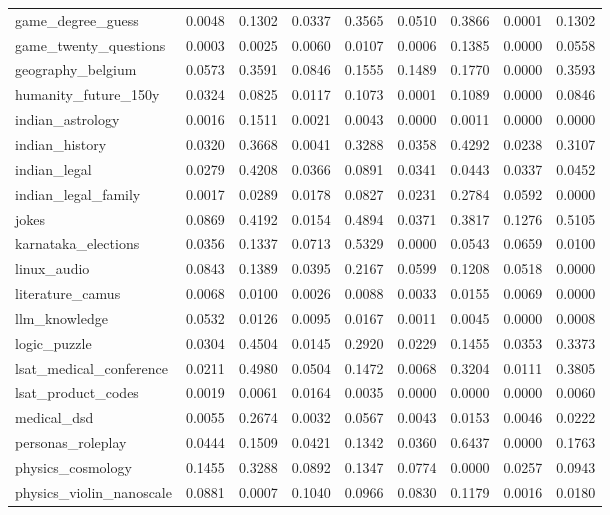 \begin{landscape}
\begin{longtable}{@{}p{3.8cm}cccccccc@{}}
game\_degree\_guess & 0.0048 & 0.1302 & 0.0337 & 0.3565 & 0.0510 & 0.3866 & 0.0001 & 0.1302 \\
game\_twenty\_questions & 0.0003 & 0.0025 & 0.0060 & 0.0107 & 0.0006 & 0.1385 & 0.0000 & 0.0558 \\
geography\_belgium & 0.0573 & 0.3591 & 0.0846 & 0.1555 & 0.1489 & 0.1770 & 0.0000 & 0.3593 \\
humanity\_future\_150y & 0.0324 & 0.0825 & 0.0117 & 0.1073 & 0.0001 & 0.1089 & 0.0000 & 0.0846 \\
indian\_astrology & 0.0016 & 0.1511 & 0.0021 & 0.0043 & 0.0000 & 0.0011 & 0.0000 & 0.0000 \\
indian\_history & 0.0320 & 0.3668 & 0.0041 & 0.3288 & 0.0358 & 0.4292 & 0.0238 & 0.3107 \\
indian\_legal & 0.0279 & 0.4208 & 0.0366 & 0.0891 & 0.0341 & 0.0443 & 0.0337 & 0.0452 \\
indian\_legal\_family & 0.0017 & 0.0289 & 0.0178 & 0.0827 & 0.0231 & 0.2784 & 0.0592 & 0.0000 \\
jokes & 0.0869 & 0.4192 & 0.0154 & 0.4894 & 0.0371 & 0.3817 & 0.1276 & 0.5105 \\
karnataka\_elections & 0.0356 & 0.1337 & 0.0713 & 0.5329 & 0.0000 & 0.0543 & 0.0659 & 0.0100 \\
linux\_audio & 0.0843 & 0.1389 & 0.0395 & 0.2167 & 0.0599 & 0.1208 & 0.0518 & 0.0000 \\
literature\_camus & 0.0068 & 0.0100 & 0.0026 & 0.0088 & 0.0033 & 0.0155 & 0.0069 & 0.0000 \\
llm\_knowledge & 0.0532 & 0.0126 & 0.0095 & 0.0167 & 0.0011 & 0.0045 & 0.0000 & 0.0008 \\
logic\_puzzle & 0.0304 & 0.4504 & 0.0145 & 0.2920 & 0.0229 & 0.1455 & 0.0353 & 0.3373 \\
lsat\_medical\_conference & 0.0211 & 0.4980 & 0.0504 & 0.1472 & 0.0068 & 0.3204 & 0.0111 & 0.3805 \\
lsat\_product\_codes & 0.0019 & 0.0061 & 0.0164 & 0.0035 & 0.0000 & 0.0000 & 0.0000 & 0.0060 \\
medical\_dsd & 0.0055 & 0.2674 & 0.0032 & 0.0567 & 0.0043 & 0.0153 & 0.0046 & 0.0222 \\
personas\_roleplay & 0.0444 & 0.1509 & 0.0421 & 0.1342 & 0.0360 & 0.6437 & 0.0000 & 0.1763 \\
physics\_cosmology & 0.1455 & 0.3288 & 0.0892 & 0.1347 & 0.0774 & 0.0000 & 0.0257 & 0.0943 \\
physics\_violin\_nanoscale & 0.0881 & 0.0007 & 0.1040 & 0.0966 & 0.0830 & 0.1179 & 0.0016 & 0.0180 \\

\end{longtable}
\end{landscape}
